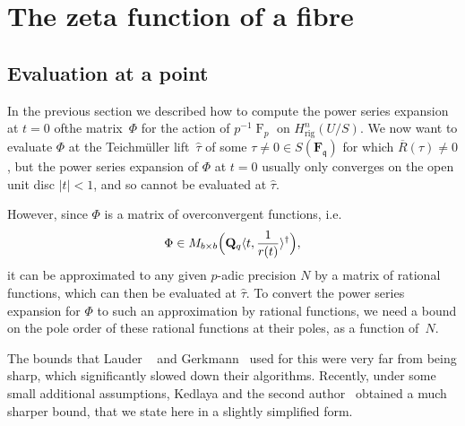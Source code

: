 \documentclass[a4paper,11pt]{article}
\numberwithin{equation}{section}
\providecommand{\abs}[1]{\lvert#1\rvert}                 %
\newcommand{\QQ}{\mathbf{Q}} %
\newcommand{\FF}{\mathbf{F}} %
\DeclareMathOperator{\Frob}{F}           %
\providecommand{\Hrig}{H_{\text{rig}}}  %
\theoremstyle{definition}
\begin{document}

\section{The zeta function of a fibre}

\subsection{Evaluation at a point}
\label{sec:Evaluation}

In the previous section we described how to compute the power series 
expansion at $t=0$ ofthe matrix~$\Phi$ for the action of $p^{-1} \Frob_p$ on 
$\Hrig^{n}(U/S)$. We now want to evaluate $\Phi$ at the Teichm\"uller 
lift~$\hat{\tau}$ of some $\tau \neq 0 \in S(\FF_{\mathfrak{q}})$ for 
which $\overline{R}(\tau) \neq 0$, but the power series expansion of $\Phi$ 
at $t=0$ usually only converges on the open unit disc $\abs{t} < 1$, 
and so cannot be evaluated at $\hat{\tau}$. 

However, since $\Phi$ is a matrix of overconvergent functions, i.e.\ 
\[
\Phi \in M_{b \times b}\Bigl(\QQ_q \langle t,\frac{1}{r(t)} \rangle^{\dag}\Bigr),
\]
it can be approximated to any given $p$-adic precision $N$ by a matrix 
of rational functions, which can then be evaluated at $\hat{\tau}$. To 
convert the power series expansion for $\Phi$ to such an approximation 
by rational functions, we need a bound on the pole order of these 
rational functions at their poles, as a function of~$N$.

The bounds that Lauder ~\citep[\S 8.1]{Lauder2004a} and 
Gerkmann~\citep[\S 6]{Gerkmann2007} used for this were very far from 
being sharp, which significantly slowed down their algorithms.
Recently, under some small additional assumptions, Kedlaya and the second 
author~\citep[Theorem~2.1]{KedlayaTuitman2012} obtained a much sharper bound,
that we state here in a slightly simplified form.
\end{document}
